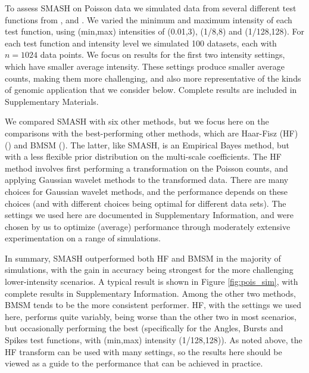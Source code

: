 \documentclass[12pt]{article}
\begin{document}
To assess SMASH on Poisson data we simulated data from
several different test functions from \cite{Timmermann1999Multiscale}, \cite{Fryzlewicz2004HaarFisz} and \cite{Besbeas2004Comparative}.
We varied the minimum and maximum intensity of each test function, using (min,max) intensities of (0.01,3), (1/8,8) and (1/128,128).
For each test function and intensity level we simulated 100 datasets, each with $n=1024$ data points.
We focus on results for the first two intensity settings, which have smaller average intensity. These settings produce smaller average counts, making them more challenging, and also more representative of the kinds of genomic application that we consider below.
Complete results are included in Supplementary Materials.

We compared SMASH with six other methods, but we focus here on the comparisons with the best-performing other methods, which are Haar-Fisz (HF) (\cite{Fryzlewicz2004HaarFisz}) and BMSM (\cite{Kolaczyk1999Bayesian}). The latter, like SMASH, is an Empirical Bayes method,  but with a less flexible prior distribution on the
multi-scale coefficients. The HF method involves first performing a transformation on the Poisson counts, and applying Gaussian wavelet methods to the transformed data. 
There are many choices for Gaussian wavelet methods, and the performance depends on these choices (and with different choices being optimal for different data sets). 
The settings we used here are documented in Supplementary Information, and were chosen by us to optimize (average) performance through moderately extensive experimentation on a range of simulations.

In summary, SMASH outperformed both HF and BMSM in the majority of simulations, with the gain in accuracy being strongest for the more challenging lower-intensity
scenarios. A typical result is shown in Figure \ref{fig:pois_sim}, with complete results in Supplementary Information. 
Among the other two methods, BMSM tends to be the more consistent performer. HF, with the settings
we used here, performs quite variably, being worse than the other two in most scenarios, but occasionally performing the best (specifically for the Angles, Bursts and Spikes test functions,
with (min,max) intensity (1/128,128)). As noted above, the HF transform can be used with many settings, so the results here should be viewed as a guide to the 
performance that can be achieved in practice.
\end{document}
